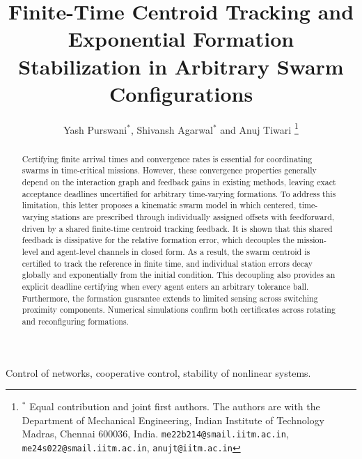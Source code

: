 \documentclass[letterpaper, 10 pt, conference]{ieeeconf}
\begin{document}

\title{\LARGE \bf Finite-Time Centroid Tracking and Exponential Formation Stabilization in Arbitrary Swarm Configurations}

\author{Yash Purswani$^{*}$,
        Shivansh Agarwal$^{*}$
        and Anuj Tiwari%
\thanks{$^*$ Equal contribution and joint first authors. The authors are with the Department of Mechanical Engineering,
Indian Institute of Technology Madras, Chennai 600036, India.
{\tt\small me22b214@smail.iitm.ac.in},
{\tt\small me24s022@smail.iitm.ac.in},
{\tt\small anujt@iitm.ac.in}}%
}

\maketitle

\begin{abstract}
Certifying finite arrival times and convergence rates is essential for coordinating swarms in time-critical missions. However, these convergence properties generally depend on the interaction graph and feedback gains in existing methods, leaving exact acceptance deadlines uncertified for arbitrary time-varying formations. To address this limitation, this letter proposes a kinematic swarm model in which centered, time-varying stations are prescribed through individually assigned offsets with feedforward, driven by a shared finite-time centroid tracking feedback. It is shown that this shared feedback is dissipative for the relative formation error, which decouples the mission-level and agent-level channels in closed form. As a result, the swarm centroid is certified to track the reference in finite time, and individual station errors decay globally and exponentially from the initial condition. This decoupling also provides an explicit deadline certifying when every agent enters an arbitrary tolerance ball. Furthermore, the formation guarantee extends to limited sensing across switching proximity components. Numerical simulations confirm both certificates across rotating and reconfiguring formations.
\end{abstract}

\begin{keywords}
Control of networks, cooperative control, stability of nonlinear systems.
\end{keywords}
\end{document}
